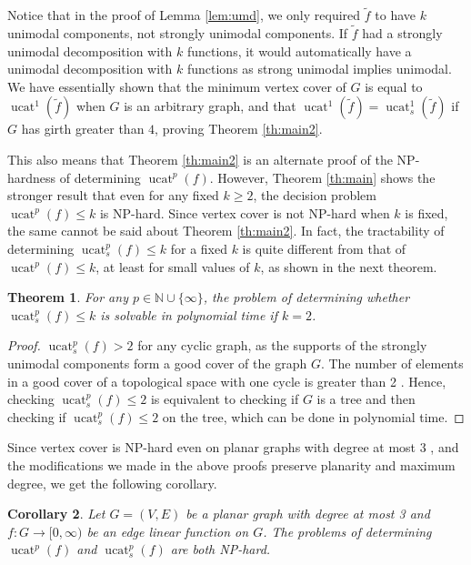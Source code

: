 \documentclass[11pt]{article}
\DeclareMathOperator{\ucat}{ucat}
\newtheorem{thm}{Theorem}[section]
\newtheorem{cor}[thm]{Corollary}
\begin{document}
Notice that in the proof of Lemma \ref{lem:umd}, we only required $\tilde{f}$ to have $k$ unimodal components, not strongly unimodal components. If $\tilde{f}$ had a strongly unimodal decomposition with $k$ functions, it would automatically have a unimodal decomposition with $k$ functions as strong unimodal implies unimodal. We have essentially shown that the minimum vertex cover of $G$ is equal to $\ucat^1(\tilde{f})$ when $G$ is an arbitrary graph, and that $\ucat^1(\tilde{f}) = \ucat^1_s(\tilde{f})$ if $G$ has girth greater than $4$, proving Theorem \ref{th:main2}.

This also means that Theorem \ref{th:main2} is an alternate proof of the NP-hardness of determining $\ucat^p(f)$. However, Theorem \ref{th:main} shows the stronger result that even for any fixed $k \geq 2$, the decision problem $\ucat^p(f) \leq k$ is NP-hard. Since vertex cover is not NP-hard when $k$ is fixed, the same cannot be said about Theorem \ref{th:main2}. In fact, the tractability of determining $\ucat_s^p(f) \leq k$ for a fixed $k$ is quite different from that of $\ucat^p(f) \leq k$, at least for small values of $k$, as shown in the next theorem.

\begin{thm}
\label{th:diff-s}
For any $p \in \mathbb{N}\cup\{\infty\}$, the problem of determining whether $\ucat_s^p(f) \leq k$ is solvable in polynomial time if $k = 2$. 
\end{thm}
\begin{proof}
    $\ucat_s^p(f) > 2$ for any cyclic graph, as the supports of the strongly unimodal components form a good cover of the graph $G$. The number of elements in a good cover of a topological space with one cycle is greater than 2 \cite{Kar17}.
    Hence, checking $\ucat_s^p(f) \leq 2$ is equivalent to checking if $G$ is a tree and then checking if $\ucat_s^p(f) \leq 2$ on the tree, which can be done in polynomial time.
\end{proof}

Since vertex cover is NP-hard even on planar graphs with degree at most 3 \cite{Mur92}, and the modifications we made in the above proofs preserve planarity and maximum degree, we get the following corollary.

\begin{cor}
\label{cor:cor1}
Let $G = (V,E)$ be a planar graph with degree at most 3 and $f : G \rightarrow [0,\infty)$ be an edge linear function on $G$. The problems of determining $\ucat^p(f)$ and $\ucat_s^p(f)$ are both NP-hard.
\end{cor}
\end{document}
